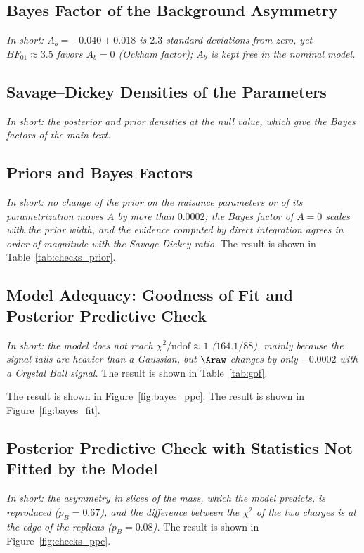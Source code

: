 \subsection{Bayes Factor of the Background Asymmetry}
\emph{In short: $A_b=-0.040\pm0.018$ is $2.3$ standard deviations from zero, yet $BF_{01}\approx3.5$ favors $A_b=0$ (Ockham factor); $A_b$ is kept free in the nominal model.}

\subsection{Savage--Dickey Densities of the Parameters}
\label{app:sd_densities}
\emph{In short: the posterior and prior densities at the null value, which give the Bayes factors of the main text.}

\subsection{Priors and Bayes Factors}
\label{sec:checks_prior}
\emph{In short: no change of the prior on the nuisance parameters or of its parametrization moves $A$ by more than $0.0002$; the Bayes factor of $A=0$ scales with the prior width, and the evidence computed by direct integration agrees in order of magnitude with the Savage-Dickey ratio.}
The result is shown in Table~\ref{tab:checks_prior}.


\subsection{Model Adequacy: Goodness of Fit and Posterior Predictive Check}
\label{sec:bayes_gof}
\emph{In short: the model does not reach $\chi^2/\mathrm{ndof}\approx1$ ($164.1/88$), mainly because the signal tails are heavier than a Gaussian, but $\Araw$ changes by only $-0.0002$ with a Crystal Ball signal.}
The result is shown in Table~\ref{tab:gof}.

The result is shown in Figure~\ref{fig:bayes_ppc}.
The result is shown in Figure~\ref{fig:bayes_fit}.


\subsection{Posterior Predictive Check with Statistics Not Fitted by the Model}
\label{sec:checks_ppc}
\emph{In short: the asymmetry in slices of the mass, which the model predicts, is reproduced ($p_B=0.67$), and the difference between the $\chi^2$ of the two charges is at the edge of the replicas ($p_B=0.08$).}
The result is shown in Figure~\ref{fig:checks_ppc}.


